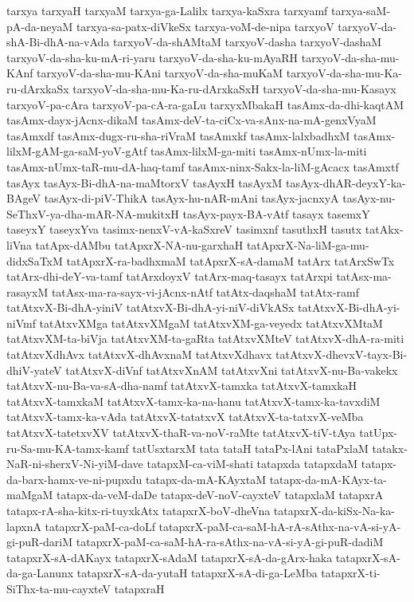 {tarxya
tarxyaH
tarxyaM
tarxya-ga-Lalilx
tarxya-kaSxra
tarxyamf
tarxya-saM-pA-da-neyaM
tarxya-sa-patx-diVkeSx
tarxya-voM-de-nipa
tarxyoV
tarxyoV-da-shA-Bi-dhA-na-vAda
tarxyoV-da-shAMtaM
tarxyoV-dasha
tarxyoV-dashaM
tarxyoV-da-sha-ku-mA-ri-yaru
tarxyoV-da-sha-ku-mAyaRH
tarxyoV-da-sha-mu-KAnf
tarxyoV-da-sha-mu-KAni
tarxyoV-da-sha-muKaM
tarxyoV-da-sha-mu-Ka-ru-dArxkaSx
tarxyoV-da-sha-mu-Ka-ru-dArxkaSxH
tarxyoV-da-sha-mu-Kasayx
tarxyoV-pa-cAra
tarxyoV-pa-cA-ra-gaLu
tarxyxMbakaH
tasAmx-da-dhi-kaqtAM
tasAmx-dayx-jAcnx-dikaM
tasAmx-deV-ta-ciCx-va-sAnx-na-mA-genxVyaM
tasAmxdf
tasAmx-dugx-ru-sha-riVraM
tasAmxkf
tasAmx-lalxbadhxM
tasAmx-lilxM-gAM-ga-saM-yoV-gAtf
tasAmx-lilxM-ga-miti
tasAmx-nUmx-la-miti
tasAmx-nUmx-taR-mu-dA-haq-tamf
tasAmx-ninx-Sakx-la-liM-gAcacx
tasAmxtf
tasAyx
tasAyx-Bi-dhA-na-maMtorxV
tasAyxH
tasAyxM
tasAyx-dhAR-deyxY-ka-BAgeV
tasAyx-di-piV-ThikA
tasAyx-hu-nAR-mAni
tasAyx-jacnxyA
tasAyx-nu-SeThxV-ya-dha-mAR-NA-mukitxH
tasAyx-payx-BA-vAtf
tasayx
tasemxY
taseyxY
taseyxYva
tasimx-nenxV-vA-kaSxreV
tasimxnf
tasuthxH
tasutx
tatAkx-liVna
tatApx-dAMbu
tatApxrX-NA-nu-garxhaH
tatApxrX-Na-liM-ga-mu-didxSaTxM
tatApxrX-ra-badhxmaM
tatApxrX-sA-damaM
tatArx
tatArxSwTx
tatArx-dhi-deY-va-tamf
tatArxdoyxV
tatArx-maq-tasayx
tatArxpi
tatAsx-ma-rasayxM
tatAsx-ma-ra-sayx-vi-jAcnx-nAtf
tatAtx-daqshaM
tatAtx-ramf
tatAtxvX-Bi-dhA-yiniV
tatAtxvX-Bi-dhA-yi-niV-diVkASx
tatAtxvX-Bi-dhA-yi-niVmf
tatAtxvXMga
tatAtxvXMgaM
tatAtxvXM-ga-veyedx
tatAtxvXMtaM
tatAtxvXM-ta-biVja
tatAtxvXM-ta-gaRta
tatAtxvXMteV
tatAtxvX-dhA-ra-miti
tatAtxvXdhAvx
tatAtxvX-dhAvxnaM
tatAtxvXdhavx
tatAtxvX-dhevxV-tayx-Bi-dhiV-yateV
tatAtxvX-diVnf
tatAtxvXnAM
tatAtxvXni
tatAtxvX-nu-Ba-vakekx
tatAtxvX-nu-Ba-va-sA-dha-namf
tatAtxvX-tamxka
tatAtxvX-tamxkaH
tatAtxvX-tamxkaM
tatAtxvX-tamx-ka-na-hanu
tatAtxvX-tamx-ka-tavxdiM
tatAtxvX-tamx-ka-vAda
tatAtxvX-tatatxvX
tatAtxvX-ta-tatxvX-veMba
tatAtxvX-tatetxvXV
tatAtxvX-thaR-va-noV-raMte
tatAtxvX-tiV-tAya
tatUpx-ru-Sa-mu-KA-tamx-kamf
tatUsxtarxM
tata
tataH
tataPx-lAni
tataPxlaM
tatakx-NaR-ni-sherxV-Ni-yiM-dave
tatapxM-ca-viM-shati
tatapxda
tatapxdaM
tatapx-da-barx-hamx-ve-ni-pupxdu
tatapx-da-mA-KAyxtaM
tatapx-da-mA-KAyx-ta-maMgaM
tatapx-da-veM-daDe
tatapx-deV-noV-cayxteV
tatapxlaM
tatapxrA
tatapx-rA-sha-kitx-ri-tuyxkAtx
tatapxrX-boV-dheVna
tatapxrX-da-kiSx-Na-ka-lapxnA
tatapxrX-paM-ca-doLf
tatapxrX-paM-ca-saM-hA-rA-sAthx-na-vA-si-yA-gi-puR-dariM
tatapxrX-paM-ca-saM-hA-ra-sAthx-na-vA-si-yA-gi-puR-dadiM
tatapxrX-sA-dAKayx
tatapxrX-sAdaM
tatapxrX-sA-da-gArx-haka
tatapxrX-sA-da-ga-Lanunx
tatapxrX-sA-da-yutaH
tatapxrX-sA-di-ga-LeMba
tatapxrX-ti-SiThx-ta-mu-cayxteV
tatapxraH
}
